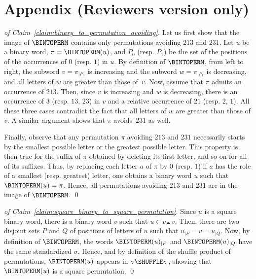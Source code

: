 \section*{Appendix (Reviewers version only)}

\begin{proof}[of Claim~\ref{claim:binary_to_permutation_avoiding}]
    Let us first show that the image of $\BINTOPERM$ contains only
    permutations avoiding $213$ and $231$. Let $u$ be a binary word,
    $\pi = \BINTOPERM(u)$, and $P_0$ (resp. $P_1$) be the set of the
    positions of the occurrences of $0$ (resp. $1$) in $u$. By
    definition of $\BINTOPERM$, from left to right, the subword
    $v = \pi_{|P_0}$ is increasing and the subword $w = \pi_{|P_1}$
    is decreasing, and all letters of $w$ are greater than those
    of~$v$. Now, assume that $\pi$ admits an occurrence of $213$.
    Then, since $v$ is increasing and $w$ is decreasing, there is an
    occurrence of $3$ (resp. $13$, $23$) in $v$ and a relative
    occurrence of $21$ (resp. $2$, $1$). All these three cases
    contradict the fact that all letters of $w$ are greater than
    those of $v$. A similar argument shows that $\pi$ avoids~$231$
    as well.
    \smallskip

    Finally, observe that any permutation $\pi$ avoiding $213$ and
    $231$ necessarily starts by the smallest possible letter or the
    greatest possible letter. This property is then true for the
    suffix of $\pi$ obtained by deleting its first letter,
    and so on for all of its suffixes. Thus, by
    replacing each letter $a$ of $\pi$ by $0$ (resp. $1$) if $a$ has the
    role of a smallest (resp. greatest) letter, one obtains a binary
    word $u$ such that $\BINTOPERM(u) = \pi$. Hence, all permutations
    avoiding $213$ and $231$ are in the image of $\BINTOPERM$.
    \qed
\end{proof}
\bigskip

\begin{proof}[of Claim~\ref{claim:square_binary_to_square_permutation}]
    Since $u$ is a square binary word, there is a binary word $v$
    such that $u \in v \shuffle v$. Then, there are two disjoint
    sets $P$ and $Q$ of positions of letters of $u$ such that
    $u_{|P} = v = u_{|Q}$. Now, by definition of $\BINTOPERM$, the
    words $\BINTOPERM(u)_{|P}$ and $\BINTOPERM(u)_{|Q}$ have the
    same standardized $\sigma$. Hence, and by definition of
    the shuffle product of permutations, $\BINTOPERM(u)$ appears in
    $\sigma \SHUFFLE \sigma$, showing that $\BINTOPERM(u)$ is a
    square permutation.
    \qed
\end{proof}
\bigskip

